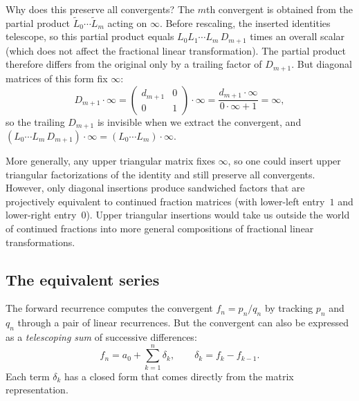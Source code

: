 \documentclass{article}
\begin{document}
Why does this preserve all convergents? The $m$th convergent is obtained from the partial product $\tilde{L}_0 \cdots \tilde{L}_m$ acting on $\infty$. Before rescaling, the inserted identities telescope, so this partial product equals $L_0 L_1 \cdots L_m\, D_{m+1}$ times an overall scalar (which does not affect the fractional linear transformation). The partial product therefore differs from the original only by a trailing factor of $D_{m+1}$. But diagonal matrices of this form fix $\infty$:
\begin{equation}
  D_{m+1} \cdot \infty
  = \begin{pmatrix} d_{m+1} & 0 \\ 0 & 1 \end{pmatrix} \cdot \infty
  = \frac{d_{m+1} \cdot \infty}{0 \cdot \infty + 1}
  = \infty,
\end{equation}
so the trailing $D_{m+1}$ is invisible when we extract the convergent, and $(L_0 \cdots L_m\, D_{m+1}) \cdot \infty = (L_0 \cdots L_m) \cdot \infty$.

More generally, any upper triangular matrix fixes $\infty$, so one could insert upper triangular factorizations of the identity and still preserve all convergents. However, only diagonal insertions produce sandwiched factors that are projectively equivalent to continued fraction matrices (with lower-left entry~$1$ and lower-right entry~$0$). Upper triangular insertions would take us outside the world of continued fractions into more general compositions of fractional linear transformations.

\subsection*{The equivalent series}

The forward recurrence computes the convergent $f_n = p_n/q_n$ by tracking $p_n$ and $q_n$ through a pair of linear recurrences. But the convergent can also be expressed as a \emph{telescoping sum} of successive differences:
\begin{equation}
  f_n = a_0 + \sum_{k=1}^{n} \delta_k, \qquad \delta_k = f_k - f_{k-1}.
\end{equation}
Each term $\delta_k$ has a closed form that comes directly from the matrix representation.
\end{document}
